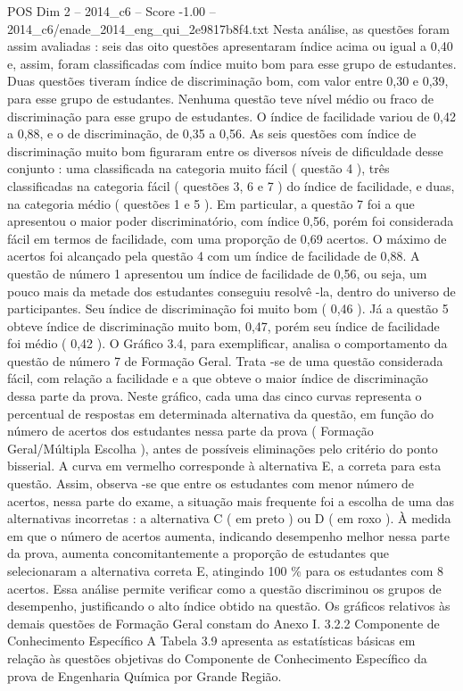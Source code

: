 \begin{textsample}{POS Dim 2 – 2014\_c6 – Score -1.00 – 2014\_c6/enade\_2014\_eng\_qui\_2e9817b8f4.txt}
Nesta análise, as questões foram assim avaliadas : seis das oito questões apresentaram índice acima ou igual a 0,40 e, assim, foram classificadas com índice muito bom para esse grupo de estudantes.
Duas questões tiveram índice de discriminação bom, com valor entre 0,30 e 0,39, para esse grupo de estudantes.
Nenhuma questão teve nível médio ou fraco de discriminação para esse grupo de estudantes.
O índice de facilidade variou de 0,42 a 0,88, e o de discriminação, de 0,35 a 0,56.
As seis questões com índice de discriminação muito bom figuraram entre os diversos níveis de dificuldade desse conjunto : uma classificada na categoria muito fácil ( questão 4 ), três classificadas na categoria fácil ( questões 3, 6 e 7 ) do índice de facilidade, e duas, na categoria médio ( questões 1 e 5 ).
Em particular, a questão 7 foi a que apresentou o maior poder discriminatório, com índice 0,56, porém foi considerada fácil em termos de facilidade, com uma proporção de 0,69 acertos.
O máximo de acertos foi alcançado pela questão 4 com um índice de facilidade de 0,88.
A questão de número 1 apresentou um índice de facilidade de 0,56, ou seja, um pouco mais da metade dos estudantes conseguiu resolvê -la, dentro do universo de participantes.
Seu índice de discriminação foi muito bom ( 0,46 ).
Já a questão 5 obteve índice de discriminação muito bom, 0,47, porém seu índice de facilidade foi médio ( 0,42 ).
O Gráfico 3.4, para exemplificar, analisa o comportamento da questão de número 7 de Formação Geral.
Trata -se de uma questão considerada fácil, com relação a facilidade e a que obteve o maior índice de discriminação dessa parte da prova.
Neste gráfico, cada uma das cinco curvas representa o percentual de respostas em determinada alternativa da questão, em função do número de acertos dos estudantes nessa parte da prova ( Formação Geral/Múltipla Escolha ), antes de possíveis eliminações pelo critério do ponto bisserial.
A curva em vermelho corresponde à alternativa E, a correta para esta questão.
Assim, observa -se que entre os estudantes com menor número de acertos, nessa parte do exame, a situação mais frequente foi a escolha de uma das alternativas incorretas : a alternativa C ( em preto ) ou D ( em roxo ).
À medida em que o número de acertos aumenta, indicando desempenho melhor nessa parte da prova, aumenta concomitantemente a proporção de estudantes que selecionaram a alternativa correta E, atingindo 100 \% para os estudantes com 8 acertos.
Essa análise permite verificar como a questão discriminou os grupos de desempenho, justificando o alto índice obtido na questão.
Os gráficos relativos às demais questões de Formação Geral constam do Anexo I. 3.2.2 Componente de Conhecimento Específico A Tabela 3.9 apresenta as estatísticas básicas em relação às questões objetivas do Componente de Conhecimento Específico da prova de Engenharia Química por Grande Região.

\end{textsample}
